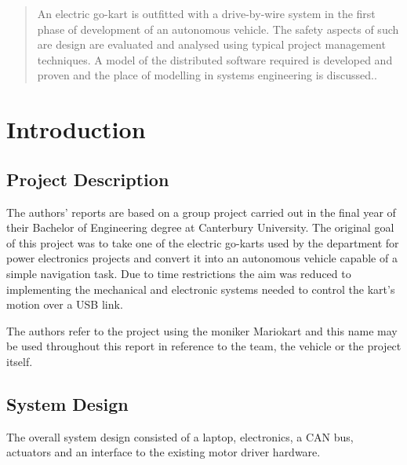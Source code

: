 
\begin{abstract}
An electric go-kart is outfitted with a drive-by-wire system in the first phase of development of 
an autonomous vehicle. The safety aspects of such are design are evaluated and analysed  
using typical project management techniques. A model of the distributed software required is 
developed and proven and the place of modelling in systems engineering is discussed..
\end{abstract}

\section{Introduction}

\subsection{Project Description}

The authors' reports are based on a group project carried out in the final year 
of their Bachelor of Engineering degree at Canterbury University. The original goal 
of this project was to take one of the electric go-karts used by the department for
power electronics projects and convert it into an autonomous vehicle capable of
a simple navigation task. Due to time restrictions the aim was reduced to implementing
the mechanical and electronic systems needed to control the kart's motion over a USB link.

The authors refer to the project using the moniker Mariokart and this name may be used 
throughout this report in reference to the team, the vehicle or the project itself.

\subsection{System Design}
The overall system design consisted of a laptop, electronics, a CAN bus, actuators and an interface to 
the existing motor driver  hardware.


